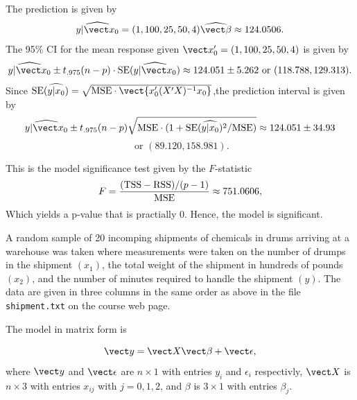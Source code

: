 \documentclass{homework}
\begin{document}
\begin{longproblem}
The prediction is given by 
$$
  \hat{ y|\vect x_0} = (1,100,25,50,4) \hat{\vect\beta} \approx  124.0506.
$$
 The 95\% CI for the mean response given $\vect x_0' = (1,100,25,50,4)$ is
given by 
$$\hat{ y|\vect x_0} \pm t_{.975}(n-p)\cdot\SE(\hat{y|\vect x_0}) \approx 124.051 \pm 5.262\text{ or }(
118.788, 129.313 ).$$  
Since $\SE(\hat{y|x_0}) = \sqrt{\MSE \cdot\vect{x_0'(X'X)^{-1}x_0}}$,the prediction interval is given by 
$$\hat{ y|\vect x_0} \pm t_{.975}(n-p)\sqrt{\MSE\cdot(1+\SE(\hat{y|x_0})^2/\MSE)}\approx 124.051 \pm 34.93$$
$$\text{ or }( 89.120, 158.981 ).$$
 


This is the model significance test given by the $F$-statistic
$$
  F = \frac{(\mathrm{TSS} - \mathrm{RSS})/(p-1)}{\mathrm{MSE}} \approx 751.0606,
$$
Which yields a p-value that is practially 0.  Hence, the model is significant.
\end{longproblem}

\begin{longproblem}
A random sample of 20 incomping shipments of chemicals in drums arriving at a warehouse was taken where measurements were taken on the number of drumps in the shipment $(x_1)$, the total weight of the shipment in hundreds of pounds $(x_2)$, and the number of minutes required to handle the shipment $(y)$. The data are given in three columns in the same order as above in the file \texttt{shipment.txt} on the course web page.


The model in matrix form is

$$
\vect y = \vect X \vect \beta + \vect \epsilon,
$$
where $\vect y$ and $\vect \epsilon$ are $n \times 1$ with entries $y_i$ and $\epsilon_i$ respectivly, $\vect X$ is $n\times 3$ with entries $x_{ij}$ with $j=0,1,2$, and $\beta$ is $3 \times 1$ with entries $\beta_j$.





\end{longproblem}
\end{document}
